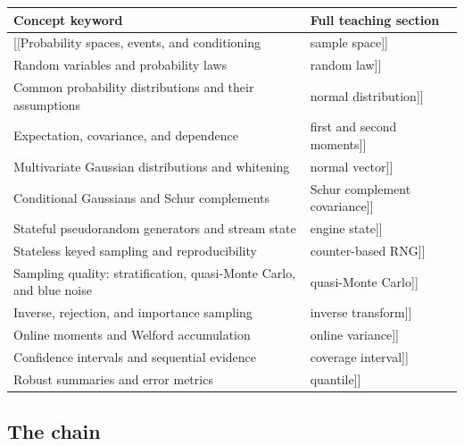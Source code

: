 {\def\LTcaptype{none} %
\begin{longtable}[]{@{}
  >{\raggedright\arraybackslash}p{}
  >{\raggedright\arraybackslash}p{}@{}}
\toprule\noalign{}
\begin{minipage}[b]{\linewidth}\raggedright
Concept keyword
\end{minipage} & \begin{minipage}[b]{\linewidth}\raggedright
Full teaching section
\end{minipage} \\
\midrule\noalign{}
\endhead
\bottomrule\noalign{}
\endlastfoot
{[}{[}Probability spaces, events, and conditioning & sample space{]}{]} \\
{[}{[}Random variables and probability laws & random law{]}{]} \\
{[}{[}Common probability distributions and their assumptions & normal distribution{]}{]} \\
{[}{[}Expectation, covariance, and dependence & first and second moments{]}{]} \\
{[}{[}Multivariate Gaussian distributions and whitening & normal vector{]}{]} \\
{[}{[}Conditional Gaussians and Schur complements & Schur complement covariance{]}{]} \\
{[}{[}Stateful pseudorandom generators and stream state & engine state{]}{]} \\
{[}{[}Stateless keyed sampling and reproducibility & counter-based RNG{]}{]} \\
{[}{[}Sampling quality: stratification, quasi-Monte Carlo, and blue noise & quasi-Monte Carlo{]}{]} \\
{[}{[}Inverse, rejection, and importance sampling & inverse transform{]}{]} \\
{[}{[}Online moments and Welford accumulation & online variance{]}{]} \\
{[}{[}Confidence intervals and sequential evidence & coverage interval{]}{]} \\
{[}{[}Robust summaries and error metrics & quantile{]}{]} \\
\end{longtable}
}

\subsection{The chain}\label{appendix-cb5af353ef77-the-chain}

